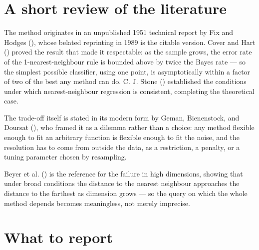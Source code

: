 \documentclass[
  letterpaper,
  10pt,
  twoside,
  openright,
  numbers=noenddot,
  chapterprefix=true]{scrbook}
\begin{document}
\section{A short review of the
literature}\label{a-short-review-of-the-literature-6}

\begin{qmiblit}

The method originates in an unpublished 1951 technical report by Fix and
Hodges (), whose belated reprinting in 1989
is the citable version. Cover and Hart ()
proved the result that made it respectable: as the sample grows, the
error rate of the 1-nearest-neighbour rule is bounded above by twice the
Bayes rate --- so the simplest possible classifier, using one point, is
asymptotically within a factor of two of the best any method can do. C.
J. Stone () established the conditions
under which nearest-neighbour regression is consistent, completing the
theoretical case.

The trade-off itself is stated in its modern form by Geman, Bienenstock,
and Doursat (), who framed it as a dilemma
rather than a choice: any method flexible enough to fit an arbitrary
function is flexible enough to fit the noise, and the resolution has to
come from outside the data, as a restriction, a penalty, or a tuning
parameter chosen by resampling.

Beyer et al. () is the reference for the
failure in high dimensions, showing that under broad conditions the
distance to the nearest neighbour approaches the distance to the
farthest as dimension grows --- so the query on which the whole method
depends becomes meaningless, not merely imprecise.

\end{qmiblit}

\section{What to report}\label{what-to-report-6}
\end{document}

